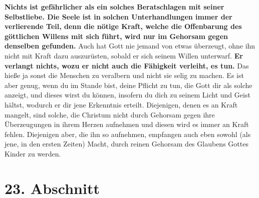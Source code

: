 \label{ref:04_22_vernunft_und_ego}
\textbf{Nichts ist gefährlicher als ein solches Beratschlagen mit seiner
Selbstliebe.
Die Seele ist in solchen Unterhandlungen immer der verlierende Teil,
denn die
nötige Kraft, welche die Offenbarung des göttlichen Willens mit sich führt,
wird nur im Gehorsam gegen denselben gefunden.} Auch hat Gott nie jemand von
etwas überzeugt, ohne ihn nicht mit Kraft dazu auszurüsten, sobald er sich
seinem Willen unterwarf. \textbf{Er verlangt nichts, wozu er nicht auch die
Fähigkeit
verleiht, es tun.} Das hieße ja sonst die Menschen zu
veralbern und
nicht sie
selig zu machen. Es ist aber genug, wenn du im Stande bist, deine Pflicht zu
tun, die Gott dir als solche anzeigt, und dieses wirst du können, insofern du
dich zu seinem Licht und Geist hältst, wodurch er dir jene Erkenntnis
erteilt. Diejenigen, denen es an Kraft mangelt, sind solche, die Christum nicht
durch Gehorsam gegen ihre Überzeugungen in ihrem Herzen aufnehmen und diesen
wird es immer an Kraft fehlen. Diejenigen aber, die ihn so aufnehmen, empfangen
auch eben sowohl (als jene, in den ersten Zeiten) Macht, durch reinen Gehorsam
des Glaubens Gottes Kinder zu werden.

\section{23. Abschnitt} \label{kap4_ab23}

